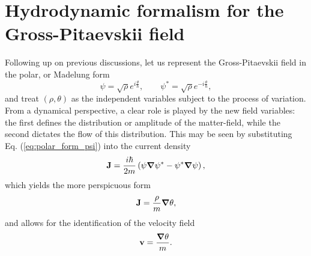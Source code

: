 \documentclass[twocolumn, nofootinbib, nobibnotes, amsmath,amssymb,aps, pra, floatfix]{revtex4-1}
\renewcommand{\v}[1]{\ensuremath{\mathbf{#1}}} %
\newcommand{\gv}[1]{\ensuremath{\mbox{\boldmath$ #1 $}}} %
\newcommand{\grad}[1]{\gv{\nabla} #1} %
\begin{document}
\section{\label{sec:canonical_formalism}Hydrodynamic formalism for the Gross-Pitaevskii field}
Following up on previous discussions, let us represent the Gross-Pitaevskii field in the polar, or Madelung form
\begin{equation}
  \psi=\sqrt{\rho}e^{i\frac{\theta}{\hbar}},\quad\quad\psi^*=\sqrt{\rho}e^{-i\frac{\theta}{\hbar}},
\label{eq:polar_form_psi}
\end{equation}
and treat $\left( \rho,\theta \right)$ as the independent variables subject to the process of variation.
From a dynamical perspective, a clear role is played by the new field variables: the first defines the distribution or amplitude of the matter-field, while the second dictates the flow of this distribution.
This may be seen by substituting Eq. (\ref{eq:polar_form_psi}) into the current density
\begin{equation}
\v{J}=\frac{i\hbar}{2m}\left(\psi\grad{\psi^*}-\psi^*\grad{\psi}\right),
\label{eq:current_density}
\end{equation}
which yields the more perspicuous form
\begin{equation}
\v{J}=\frac{\rho}{m}\grad{\theta},
\label{eq:current_density_polar_form}
\end{equation}
and allows for the identification of the velocity field
\begin{equation}
\v{v}=\frac{\grad{\theta}}{m}.
\label{eq:velocity_field_polar_form}
\end{equation}
\end{document}
